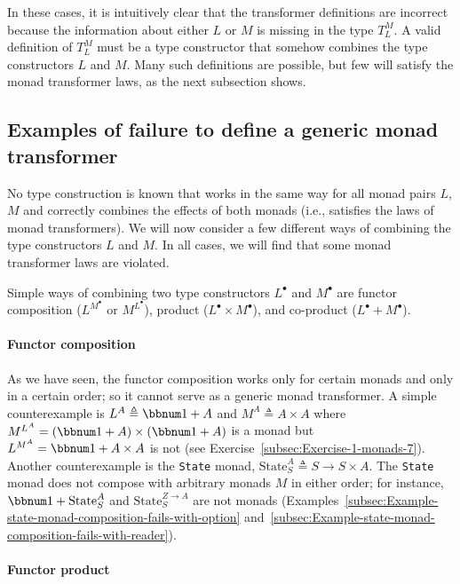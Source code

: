 In these cases, it is intuitively clear that the transformer definitions
are incorrect because the information about either $L$ or $M$ is
missing in the type $T_{L}^{M}$. A valid definition of $T_{L}^{M}$
must be a type constructor that somehow combines the type constructors
$L$ and $M$. Many such definitions are possible, but few will satisfy
the monad transformer laws, as the next subsection shows.

\subsection{Examples of failure to define a generic monad transformer}

No type construction is known that works in the same way for all monad
pairs $L$, $M$ and correctly combines the effects of both monads
(i.e., satisfies the laws of monad transformers). We will now consider
a few different ways of combining the type constructors $L$ and $M$.
In all cases, we will find that some monad transformer laws are violated.

Simple ways of combining two type constructors $L^{\bullet}$ and
$M^{\bullet}$ are functor composition ($L^{M^{\bullet}}$ or $M^{L^{\bullet}}$),
product ($L^{\bullet}\times M^{\bullet}$), and co-product ($L^{\bullet}+M^{\bullet}$).

\paragraph{Functor composition}

As we have seen, the functor composition works only for certain monads
and only in a certain order; so it cannot serve as a generic monad
transformer. A simple counterexample is $L^{A}\triangleq\bbnum 1+A$
and $M^{A}\triangleq A\times A$ where $M^{L^{A}}=\left(\bbnum 1+A\right)\times\left(\bbnum 1+A\right)$
is a monad but $L^{M^{A}}=\bbnum 1+A\times A$ is not (see Exercise~\ref{subsec:Exercise-1-monads-7}).
Another counterexample is the \lstinline!State! monad, $\text{State}_{S}^{A}\triangleq S\rightarrow S\times A$.
The \lstinline!State! monad does not compose with arbitrary monads
$M$ in either order; for instance, $\bbnum 1+\text{State}_{S}^{A}$
and $\text{State}_{S}^{Z\rightarrow A}$ are not monads (Examples~\ref{subsec:Example-state-monad-composition-fails-with-option}
and~\ref{subsec:Example-state-monad-composition-fails-with-reader}). 

\paragraph{Functor product}

